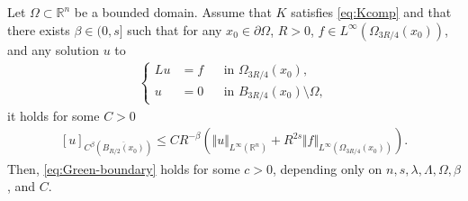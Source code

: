 \documentclass[11pt,reqno]{amsart}
\theoremstyle{plain}
\theoremstyle{definition}
\numberwithin{equation}{section}
\newcommand{\R}{\mathbb{R}}
\newcommand{\1}{\mathbbm{1}}
\begin{document}
\begin{lemma}
\label{lemma:comp-princ}
Let $\Omega \subset \R^n$ be a bounded domain. Assume that $K$ satisfies \eqref{eq:Kcomp} and that there exists $\beta \in (0,s]$ such that for any $x_0 \in \partial \Omega$, $R > 0$, $f \in L^{\infty}(\Omega_{3R/4}(x_0))$, and any solution $u$ to 
\begin{align*}
\left\{
\begin{aligned}
L u &= f &&\text{in } \Omega_{3R/4}(x_0),\\
u &= 0 &&\text{in } B_{3R/4}(x_0) \setminus \Omega,
\end{aligned}
\right.
\end{align*}
it holds for some $C > 0$
\begin{align}
\label{eq:u-reg-assumption}
    [ u ]_{C^{\beta}(\overline{B_{R/2}(x_0)})} \le C R^{-\beta} \left( \Vert u \Vert_{L^{\infty}(\R^n)} + R^{2s} \Vert f \Vert_{L^{\infty}(\Omega_{3R/4}(x_0))} \right).
\end{align}
Then, \eqref{eq:Green-boundary} holds for some $c > 0$, depending only on $n,s,\lambda,\Lambda,\Omega,\beta$, and $C$.
\end{lemma}
\end{document}
